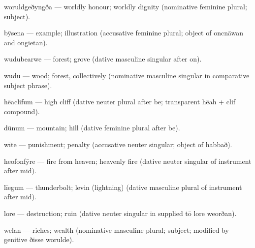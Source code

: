 woruldgeðyngða — worldly honour; worldly dignity (nominative feminine plural; subject).

bȳsena — example; illustration (accusative feminine plural; object of oncnāwan and ongietan).

wudubearwe — forest; grove (dative masculine singular after on).

wudu — wood; forest, collectively (nominative masculine singular in comparative subject phrase).

hēaclifum — high cliff (dative neuter plural after be; transparent hēah + clif compound).

dūnum — mountain; hill (dative feminine plural after be).

wīte — punishment; penalty (accusative neuter singular; object of habbað).

heofonfȳre — fire from heaven; heavenly fire (dative neuter singular of instrument after mid).

līegum — thunderbolt; levin (lightning) (dative masculine plural of instrument after mid).

lore — destruction; ruin (dative neuter singular in supplied tō lore weorðan).

welan — riches; wealth (nominative masculine plural; subject; modified by genitive ðisse worulde).

